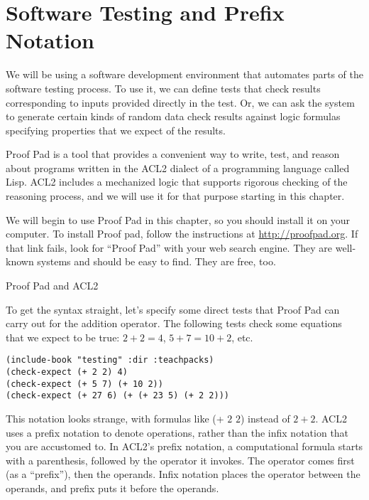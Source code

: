 \chapter{Software Testing and Prefix Notation}
\label{ch:software-testing-prefix-notation}


We will be using a software development environment that automates parts of the software testing process.
To use it, we can define tests that check results corresponding to inputs provided directly in the test.
Or, we can ask the system to generate certain kinds of random data check results
against logic formulas specifying properties that we expect of the results.

\begin{aside}
Proof Pad is a tool that provides a convenient way
to write, test, and reason about programs
written in the ACL2 dialect of a programming language called Lisp.
ACL2 includes a mechanized logic that
supports rigorous checking of the reasoning process,
and we will use it for that purpose starting in this chapter.

We will begin to use Proof Pad in this chapter,
so you should install it on your computer.
To install Proof pad, follow the instructions at \url{http://proofpad.org}.
If that link fails, look for ``Proof Pad''
with your web search engine.
They are well-known systems and should be easy to find.
They are free, too.
\label{aside:proof-pad}
\caption{Proof Pad and ACL2}
\end{aside}

To get the syntax straight, let's specify some direct tests that Proof Pad
can carry out for the addition operator.
The following tests check some equations that we expect to be true:
$2 + 2 = 4$, $5 + 7 = 10 + 2$, etc.

\begin{Verbatim}
(include-book "testing" :dir :teachpacks)
(check-expect (+ 2 2) 4)
(check-expect (+ 5 7) (+ 10 2))
(check-expect (+ 27 6) (+ (+ 23 5) (+ 2 2)))
\end{Verbatim}

This notation looks strange, with formulas like (+ $2$ $2$) instead of $2 + 2$.
ACL2 uses a prefix notation to denote operations, rather than the infix notation
that you are accustomed to.
In ACL2's prefix notation, a computational formula starts with a parenthesis,
followed by the operator it invokes.
The operator comes first (as a ``prefix''), then the operands.
Infix notation places the operator between the operands,
and prefix puts it before the operands.

